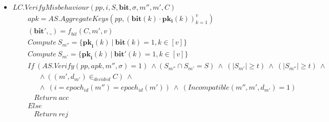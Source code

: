 \vspace{-0.5cm}
\begin{itemize}
\item $\mathit{LC.VerifyMisbehaviour}(\mathit{pp}, i, S, \mathbf{bit}, \sigma, m'', m', C)$
\vspace{-0.25cm}
\begin{align*}
& \ \ \ \ \mathit{apk} = \mathit{AS.AggregateKeys}(\mathit{pp}, (\mathbf{bit}(k) \cdot \mathbf{pk_i}(k))_{k=1}^v) \\
&\ \ \ \ (\mathbf{bit'}, \_ ) = \mathit{f_{bit}}(C, m', v) \\ 
& \ \ \ \ \mathit{Compute} \ S_{m''} = \{ \mathbf{pk}_{\mathbf{i}}(k) \ | \ \mathbf{bit}(k) = 1, k \in [v] \} \\
& \ \ \ \ \mathit{Compute} \ S_{m'} =  \{ \mathbf{pk}_{\mathbf{i}}(k) \ | \ \mathbf{bit'}(k) = 1, k \in [v] \} \\
& \ \ \ \ \mathit{If} \ (\mathit{AS.Verify}(\mathit{pp}, \mathit{apk}, m'', \sigma) = 1) \ \wedge (S_{m''} \cap S_{m'} = S) \ \wedge \ (|S_{m'}| \geq t) \ \wedge \
 (|S_{m''}| \geq t) \ \wedge \\
& \hspace{1cm} \wedge ((\mathit{m'}, d_{\mathit{m'}}) \in_{\mathit{decided}} C) \ \wedge \ \\
& \hspace{1cm} \wedge \ (i = \mathit{epoch_{id}}(m'') = \mathit{epoch_{id}}(m')) \ \wedge \ (\mathit{Incompatible(m'', m', d_{m'})} = 1)  \\
& \ \ \ \ \ \ \ \ \mathit{Return} \ \mathit{acc} \\
& \ \ \ \ \mathit{Else} \\
& \ \ \ \ \ \ \ \ \mathit{Return} \ \mathit{rej} 
\end{align*}


\end{itemize}
